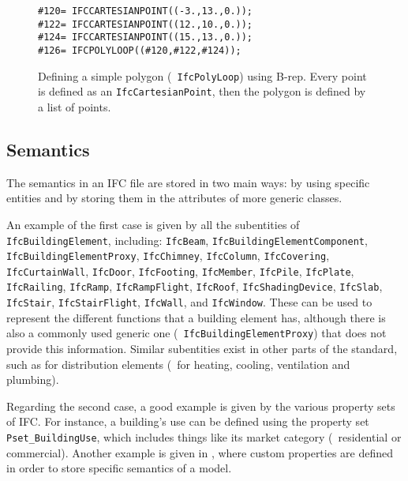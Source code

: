 \begin{figure}
\begin{lstlisting}[frame=single]
#120= IFCCARTESIANPOINT((-3.,13.,0.));
#122= IFCCARTESIANPOINT((12.,10.,0.));
#124= IFCCARTESIANPOINT((15.,13.,0.));
#126= IFCPOLYLOOP((#120,#122,#124));
\end{lstlisting}
\caption{Defining a simple polygon (\ie\ \texttt{IfcPolyLoop}) using B-rep.
Every point is defined as an \texttt{IfcCartesianPoint}, then the polygon is defined by a list of points.}%
\label{fig:brep}
\end{figure}

\subsection{Semantics}

The semantics in an IFC file are stored in two main ways: by using specific entities and by storing them in the attributes of more generic classes.

An example of the first case is given by all the subentities of \texttt{IfcBuildingElement}, including: \texttt{IfcBeam}, \texttt{IfcBuildingElementComponent}, \texttt{IfcBuildingElementProxy}, \texttt{Ifc\-Chim\-ney}, \texttt{Ifc\-Co\-lumn}, \texttt{IfcCovering}, \texttt{IfcCurtainWall}, \texttt{IfcDoor}, \texttt{IfcFooting}, \texttt{IfcMember}, \texttt{IfcPile}, \texttt{Ifc\-Plate}, \texttt{Ifc\-Rai\-ling}, \texttt{IfcRamp}, \texttt{Ifc\-Ramp\-Flight}, \texttt{IfcRoof}, \texttt{IfcShadingDevice}, \texttt{IfcSlab}, \texttt{Ifc\-Stair}, \texttt{Ifc\-Stair\-Flight}, \texttt{IfcWall}, and \texttt{Ifc\-Win\-dow}.
These can be used to represent the different functions that a building element has, although there is also a commonly used generic one (\ie\ \texttt{IfcBuildingElementProxy}) that does not provide this information.
Similar subentities exist in other parts of the standard, such as for distribution elements (\eg\ for heating, cooling, ventilation and plumbing).

Regarding the second case, a good example is given by the various property sets of IFC\@.
For instance, a building's use can be defined using the property set \texttt{Pset\_BuildingUse}, which includes things like its market category (\eg\ residential or commercial).
Another example is given in , where custom properties are defined in order to store specific semantics of a model.

